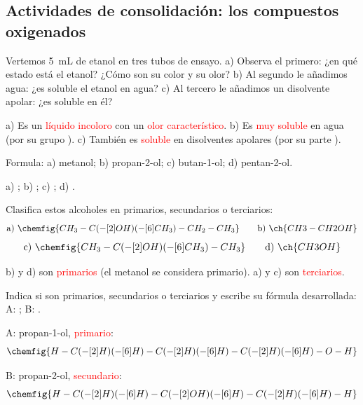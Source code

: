 \subsection*{Actividades de consolidación: los compuestos oxigenados}

\begin{exercise}
    Vertemos \qty{5}{\mL} de etanol en tres tubos de ensayo. a) Observa el primero: ¿en qué estado está el etanol? ¿Cómo son su color y su olor? b) Al segundo le añadimos agua: ¿es soluble el etanol en agua? c) Al tercero le añadimos un disolvente apolar: ¿es soluble en él?
    \begin{solu}
        a) Es un \textcolor{red}{líquido incoloro} con un \textcolor{red}{olor característico}. b) Es \textcolor{red}{muy soluble} en agua (por su grupo ). c) También es \textcolor{red}{soluble} en disolventes apolares (por su parte ).
    \end{solu}
\end{exercise}

\begin{exercise}
    Formula: a) metanol; b) propan-2-ol; c) butan-1-ol; d) pentan-2-ol.
    \begin{solu}
        a) \textcolor{red}{}; b) \textcolor{red}{};
        c) \textcolor{red}{}; d) \textcolor{red}{}.
    \end{solu}
\end{exercise}

\begin{exercise}
    Clasifica estos alcoholes en primarios, secundarios o terciarios:
    \[ \text{a)}\ \chemfig{CH_3-C(-[2]OH)(-[6]CH_3)-CH_2-CH_3} \qquad \text{b)}\ \ch{CH3-CH2OH} \]
    \[ \text{c)}\ \chemfig{CH_3-C(-[2]OH)(-[6]CH_3)-CH_3} \qquad \text{d)}\ \ch{CH3OH} \]
    \begin{solu}
        b) y d) son \textcolor{red}{primarios} (el metanol se considera primario). a) y c) son \textcolor{red}{terciarios}.
    \end{solu}
\end{exercise}

\begin{exercise}
    Indica si son primarios, secundarios o terciarios y escribe su fórmula desarrollada: A: ; B: .
    \begin{solu}
        A: propan-1-ol, \textcolor{red}{primario}: \[ \chemfig{H-C(-[2]H)(-[6]H)-C(-[2]H)(-[6]H)-C(-[2]H)(-[6]H)-O-H} \]

        B: propan-2-ol, \textcolor{red}{secundario}: \[ \chemfig{H-C(-[2]H)(-[6]H)-C(-[2]OH)(-[6]H)-C(-[2]H)(-[6]H)-H} \]
    \end{solu}
\end{exercise}

